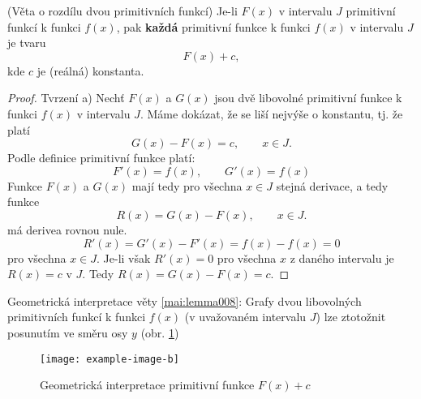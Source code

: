     \begin{mdframed}[style=mdmathlemma] 
      \begin{lemma}\label{mai:lemma008}(Věta o rozdílu dvou primitivních funkcí) Je-li \(F(x)\) v
        intervalu \(J\) primitivní funkcí k funkci \(f(x)\), pak \textbf{každá} primitivní funkce k
        funkci \(f(x)\) v intervalu \(J\) je tvaru 
        \begin{equation*}
          F(x) + c,
        \end{equation*}
        kde \(c\) je (reálná) konstanta.
        \begin{proof}
          Tvrzení a) Nechť \(F(x)\) a \(G(x)\) jsou dvě libovolné primitivní funkce k funkci
          \(f(x)\) v intervalu \(J\). Máme dokázat, že se liší nejvýše o konstantu, tj. že platí 
          \begin{equation*}
            G(x) - F(x) = c,  \qquad x\in J. 
          \end{equation*}
          Podle definice primitivní funkce platí:
          \begin{equation*}
            F'(x) = f(x), \qquad G'(x) = f(x)
          \end{equation*}
          Funkce \(F(x)\) a \(G(x)\) mají tedy pro všechna \( x\in J\) stejná derivace, a tedy
          funkce
          \begin{equation*}
            R(x) = G(x) - F(x), \qquad x\in J.
          \end{equation*}
          má derivea rovnou nule. 
          \begin{equation*}
            R'(x) = G'(x) - F'(x) = f(x) - f(x) = 0
          \end{equation*}
          pro všechna \( x\in J\). Je-li však \(R'(x)=0\) pro všechna \(x\) z daného intervalu je
          \(R(x)=c\) v \(J\). Tedy \(R(x) = G(x) - F(x)=c\).
        \end{proof}
      \end{lemma}
    \end{mdframed}

    Geometrická interpretace věty \ref{mai:lemma008}: Grafy dvou libovolných primitivních funkcí k
    funkci \(f(x)\) (v uvažovaném intervalu \(J\)) lze ztotožnit posunutím ve směru osy \(y\) (obr.
    \ref{mai:fig100})

    \begin{figure}[ht!]
      \centering
      \texttt{[image: example-image-b]} 
      \caption{Geometrická interpretace primitivní funkce \(F(x) +c\)}
      \label{mai:fig100}
    \end{figure}

